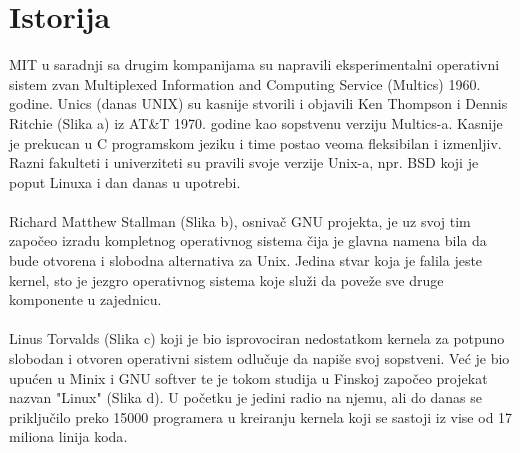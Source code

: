 \documentclass[a4paper,14pt]{article}
\begin{document}
\section{Istorija\cite{revos}}
MIT u saradnji sa drugim kompanijama su napravili eksperimentalni operativni sistem zvan Multiplexed Information and Computing Service (Multics) 1960. godine. Unics (danas UNIX) su kasnije stvorili i objavili Ken Thompson i Dennis Ritchie  (Slika a) iz AT\&T 1970. godine kao sopstvenu verziju Multics-a. Kasnije je prekucan u C programskom jeziku i time postao veoma fleksibilan i izmenljiv. Razni fakulteti i univerziteti su pravili svoje verzije Unix-a, npr. BSD koji je poput Linuxa i dan danas u upotrebi.
\\\\
Richard Matthew Stallman (Slika b), osnivač GNU projekta\cite{gnu}, je uz svoj tim započeo izradu kompletnog operativnog sistema čija je glavna namena  bila da bude otvorena i slobodna alternativa za Unix. Jedina stvar koja je falila jeste kernel, sto je jezgro operativnog sistema koje služi da poveže sve druge komponente u zajednicu.
\\\\
Linus Torvalds (Slika c) koji je bio isprovociran nedostatkom kernela za potpuno slobodan i otvoren operativni sistem odlučuje da napiše svoj sopstveni. Već je bio upućen u Minix i GNU softver te je tokom studija u Finskoj započeo projekat nazvan "Linux" (Slika d). U početku je jedini radio na njemu, ali do danas se priključilo preko 15000 programera u kreiranju kernela koji se sastoji iz vise od 17 miliona linija koda\cite{linuxfoundation}.
\\\\
\end{document}
